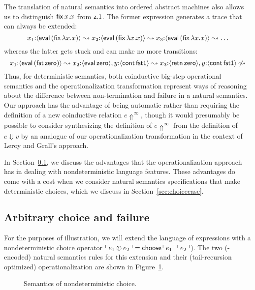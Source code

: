 The translation of natural semantics into ordered abstract machines
also allows us to distinguish ${\sf fix}\,x.x$ from ${\sf z}.1$.
The former expression generates a trace that can always be extended:
\[ x_1{:}\langle {{\sf eval}\,({\sf fix}\,\lambda x.x)} \rangle \leadsto
   x_2{:}\langle {{\sf eval}\,({\sf fix}\,\lambda x.x)} \rangle \leadsto
   x_3{:}\langle {{\sf eval}\,({\sf fix}\,\lambda x.x)} \rangle \leadsto \ldots 
\]whereas the latter gets stuck and can make no more transitions:\[ 
  x_1{:}\langle {{\sf eval}\,({\sf fst}\,{\sf zero})} \rangle \leadsto
  x_2{:}\langle {{\sf eval}\,{\sf zero}} \rangle, y{:}\langle {{\sf cont}\,{\sf fst1}} \rangle \leadsto
  x_3{:}\langle {{\sf retn}\,{\sf zero}} \rangle, y{:}\langle {{\sf cont}\,{\sf fst1}} \rangle 
  \not\leadsto
\]
Thus, for deterministic semantics, both coinductive big-step
operational semantics and the operationalization transformation
represent ways of reasoning about the difference between
non-termination and failure in a natural semantics. Our approach has
the advantage of being automatic rather than requiring the definition
of a new coinductive relation $e \Uparrow^\infty$, though it would
presumably be possible to consider synthesizing the definition of $e
\Uparrow^\infty$ from the definition of $e \Downarrow v$ by an
analogue of our operationalization transformation in the context of
Leroy and Grall's approach.

In Section~\ref{sec:choicefail}, we discuss the advantages that the
operationalization approach has in dealing with nondeterministic
language features. These advantages do come with a cost when 
we consider natural semantics specifications that make deterministic
choices, which we discuss in Section~\ref{sec:choicecase}.

\subsection{Arbitrary choice and failure}
\label{sec:choicefail}

For the purposes of illustration, we will extend the language of
expressions with a nondeterministic choice operator ${\ulcorner{e_1 \mathbin{\mbox{$\ocircle$\hspace{-7pt}{\footnotesize ?}\hspace{3pt}}}e_2}\urcorner} = {\sf choose}\,{\ulcorner{e_1}\urcorner}\,{\ulcorner{e_2}\urcorner}$).  The two
(\sls-encoded) natural semantics rules for this extension and their
(tail-recursion optimized) operationalization are shown in
Figure~\ref{fig:ns-arb}.

\begin{figure}[t]
\begin{minipage}[b]{0.45\linewidth}
\end{minipage}
\hspace{0.5cm}
\begin{minipage}[b]{0.55\linewidth}
\end{minipage}
\caption{Semantics of nondeterministic choice.}
\label{fig:ns-arb}
\end{figure}

